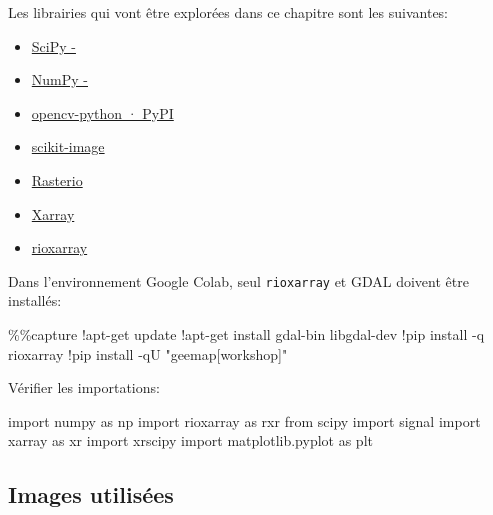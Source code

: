 \documentclass[
  11pt,
  letterpaper,
  open=any,
  twoside=false,
  french]{scrbook}
\newenvironment{Shaded}{\begin{snugshade}}{\end{snugshade}}
\newcommand{\BuiltInTok}[1]{\textcolor[rgb]{0.00,0.23,0.31}{#1}}
\newcommand{\ImportTok}[1]{\textcolor[rgb]{0.00,0.46,0.62}{#1}}
\newcommand{\NormalTok}[1]{\textcolor[rgb]{0.00,0.23,0.31}{#1}}
\newcommand{\OperatorTok}[1]{\textcolor[rgb]{0.37,0.37,0.37}{#1}}
\newcommand{\StringTok}[1]{\textcolor[rgb]{0.13,0.47,0.30}{#1}}
\begin{document}
Les librairies qui vont être explorées dans ce chapitre sont les
suivantes:

\begin{itemize}
\item
  \href{https://scipy.org/}{SciPy -}
\item
  \href{https://numpy.org/}{NumPy -}
\item
  \href{https://pypi.org/project/opencv-python/}{opencv-python · PyPI}
\item
  \href{https://scikit-image.org/}{scikit-image}
\item
  \href{https://rasterio.readthedocs.io/en/stable/}{Rasterio}
\item
  \href{https://docs.xarray.dev/en/stable/}{Xarray}
\item
  \href{https://corteva.github.io/rioxarray/stable/index.html}{rioxarray}
\end{itemize}

Dans l'environnement Google Colab, seul \texttt{rioxarray} et GDAL
doivent être installés:

\begin{Shaded}
\begin{Highlighting}[]
\OperatorTok{\%\%}\NormalTok{capture}
\OperatorTok{!}\NormalTok{apt}\OperatorTok{{-}}\NormalTok{get update}
\OperatorTok{!}\NormalTok{apt}\OperatorTok{{-}}\NormalTok{get install gdal}\OperatorTok{{-}}\BuiltInTok{bin}\NormalTok{ libgdal}\OperatorTok{{-}}\NormalTok{dev}
\OperatorTok{!}\NormalTok{pip install }\OperatorTok{{-}}\NormalTok{q rioxarray}
\OperatorTok{!}\NormalTok{pip install }\OperatorTok{{-}}\NormalTok{qU }\StringTok{"geemap[workshop]"}
\end{Highlighting}
\end{Shaded}

Vérifier les importations:

\begin{Shaded}
\begin{Highlighting}[]
\ImportTok{import}\NormalTok{ numpy }\ImportTok{as}\NormalTok{ np}
\ImportTok{import}\NormalTok{ rioxarray }\ImportTok{as}\NormalTok{ rxr}
\ImportTok{from}\NormalTok{ scipy }\ImportTok{import}\NormalTok{ signal}
\ImportTok{import}\NormalTok{ xarray }\ImportTok{as}\NormalTok{ xr}
\ImportTok{import}\NormalTok{ xrscipy}
\ImportTok{import}\NormalTok{ matplotlib.pyplot }\ImportTok{as}\NormalTok{ plt}
\end{Highlighting}
\end{Shaded}

\subsection{Images utilisées}\label{images-utilisuxe9es}
\end{document}
